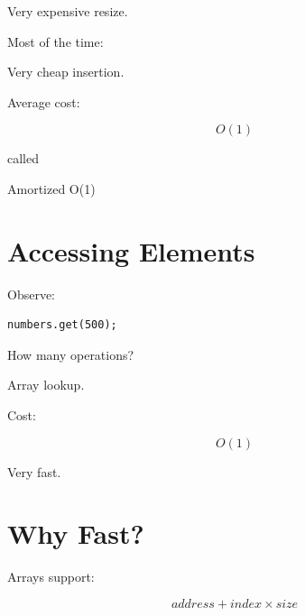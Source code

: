 \documentclass[11pt,a4paper]{book}
\begin{document}

Very expensive resize.


Most of the time:


Very cheap insertion.


Average cost:

\[
O(1)
\]


called


Amortized O(1)


\section{Accessing Elements}

Observe:

\begin{verbatim} 
numbers.get(500);
\end{verbatim}


How many operations?


Array lookup.


Cost:

\[
O(1)
\]


Very fast.


\section{Why Fast?}

Arrays support:

\[
address
+
index
\times
size
\]
\end{document}
